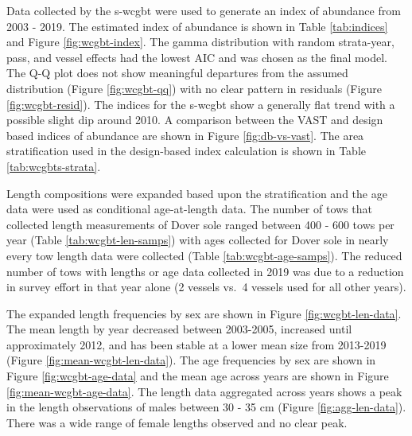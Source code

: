 \documentclass[11pt,
  english,
  a4paper,
]{article}
\begin{document}
Data collected by the \gls{s-wcgbt} were used to generate an index of abundance from 2003 - 2019. The estimated index of abundance is shown in Table \ref{tab:indices} and Figure \ref{fig:wcgbt-index}. The gamma distribution with random strata-year, pass, and vessel effects had the lowest AIC and was chosen as the final model. The Q-Q plot does not show meaningful departures from the assumed distribution (Figure \ref{fig:wcgbt-qq}) with no clear pattern in residuals (Figure \ref{fig:wcgbt-resid}). The indices for the \gls{s-wcgbt} show a generally flat trend with a possible slight dip around 2010. A comparison between the VAST and design based indices of abundance are shown in Figure \ref{fig:db-vs-vast}. The area stratification used in the design-based index calculation is shown in Table \ref{tab:wcgbts-strata}.

\leavevmode\tagmcend\tagstructend\par


Length compositions were expanded based upon the stratification and the age data were used as conditional age-at-length data. The number of tows that collected length measurements of Dover sole ranged between 400 - 600 tows per year (Table \ref{tab:wcgbt-len-samps}) with ages collected for Dover sole in nearly every tow length data were collected (Table \ref{tab:wcgbt-age-samps}). The reduced number of tows with lengths or age data collected in 2019 was due to a reduction in survey effort in that year alone (2 vessels vs.~4 vessels used for all other years).

\leavevmode\tagmcend\tagstructend\par


The expanded length frequencies by sex are shown in Figure \ref{fig:wcgbt-len-data}. The mean length by year decreased between 2003-2005, increased until approximately 2012, and has been stable at a lower mean size from 2013-2019 (Figure \ref{fig:mean-wcgbt-len-data}). The age frequencies by sex are shown in Figure \ref{fig:wcgbt-age-data} and the mean age across years are shown in Figure \ref{fig:mean-wcgbt-age-data}. The length data aggregated across years shows a peak in the length observations of males between 30 - 35 cm (Figure \ref{fig:agg-len-data}). There was a wide range of female lengths observed and no clear peak.

\leavevmode\tagmcend\tagstructend\par
\end{document}

